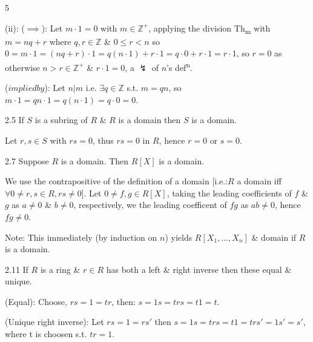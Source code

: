 \documentclass[8pt]{extarticle}
\makeatletter
\renewenvironment{proof}[1][\proofname]{%
  \par%
  \pushQED{\qed}%
  \normalfont
  \topsep=2pt\partopsep=0pt\parsep=0pt\itemsep=0pt%
  \trivlist
  \item[\hskip\labelsep\itshape #1\@addpunct{.}]\ignorespaces
}{%
  \popQED\endtrivlist\@endpefalse
  \vspace{-1pt}%
}
\makeatother
\begin{document}
\begin{multicols}{5}
\begin{proof}
            (ii): (\(\implies\)): Let \(m\cdot 1=0\) with \(m\in\mathbb{Z}^+\), applying the division Th\textsubscript{m} with \(m=nq+r\) where \(q,r\in\mathbb{Z}\) \& \(0\le r<n\) so \(0=m\cdot1=(nq+r)\cdot1=q(n\cdot1)+r\cdot1=q\cdot0+r\cdot1=r\cdot1\), so \(r=0\) as otherwise \(n>r\in\mathbb{Z}^+\) \& \(r\cdot 1=0\), a \(\lightning\) of \(n\)'s def\textsuperscript{n}.

            (\(impliedby\)): Let \(n|m\) i.e. \(\exists q\in\mathbb{Z}\) s.t. \(m=qn\), so \(m\cdot1=qn\cdot1=q(n\cdot1)=q\cdot0=0\).
        \end{proof}


        \begin{lemma}{2.5}
            If \(S\) is a subring of \(R\) \& \(R\) is a domain then \(S\) is a domain.
        \end{lemma}

        \begin{proof}
            Let \(r,s\in S\) with \(rs=0\), thus \(rs=0\) in \(R\), hence \(r=0\) or \(s=0\).
        \end{proof}

        \begin{proposition}{2.7}
            Suppose \(R\) is a domain. Then \(R[X]\) is a domain.
        \end{proposition}

        \begin{proof}
            We use the contrapositive of the definition of a domain [i.e.:\(R\) a domain iff \(\forall 0\ne r,s\in R, rs\ne 0\)]. Let \(0\ne f,g\in R[X]\), taking the leading coefficients of \(f\) \& \(g\) as \(a\ne0\) \& \(b\ne0\), respectively, we the leading coefficent of \(fg\) as \(ab\ne0\), hence \(fg\ne0\).
        \end{proof}

        {\footnotesize Note: This immediately (by induction on \(n\)) yields \(R[X_1,\ldots,X_n]\) \& domain if \(R\) is a domain.}

        \begin{lemma}{2.11}
            If \(R\) is a ring \& \(r\in R\) has both a left \& right inverse then these equal \& unique.
        \end{lemma}

        \begin{proof}
            (Equal): Choose, \(rs=1=tr\), then: \(s=1s=trs=t1=t\).

            (Unique right inverse): Let \(rs=1=rs'\) then \(s=1s=trs=t1=trs'=1s'=s'\), where t is choosen s.t. \(tr=1\).


\end{proof}
\end{multicols}
\end{document}
